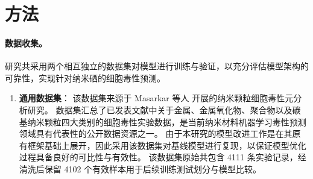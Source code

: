 \section{方法}

\paragraph{数据收集。}
研究共采用两个相互独立的数据集对模型进行训练与验证，以充分评估模型架构的可靠性，实现针对纳米硒的细胞毒性预测。

\begin{enumerate}
  \item \textbf{通用数据集}：
该数据集来源于 Masarkar 等人 \cite{masarkar2024} 开展的纳米颗粒细胞毒性元分析研究。
数据集汇总了已发表文献中关于金属、金属氧化物、聚合物以及碳基纳米颗粒四大类别的细胞毒性实验数据，是当前纳米材料机器学习毒性预测领域具有代表性的公开数据资源之一。
由于本研究的模型改进工作是在其原有框架基础上展开，因此采用该数据集对基线模型进行复现，以保证模型优化过程具备良好的可比性与有效性。
该数据集原始共包含 4111 条实验记录，经清洗后保留 4102 个有效样本用于后续训练测试划分与模型比较。


\end{enumerate}
